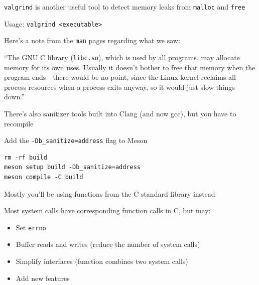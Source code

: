 \begin{slide}
  

  \texttt{valgrind} is another useful tool to detect memory leaks from
  \texttt{malloc} and \texttt{free}

  \leftspace{}Usage: \texttt{valgrind <executable>}
  \bigskip


  Here's a note from the \texttt{man} pages regarding what we saw:
  \medskip

  ``The GNU C library (\texttt{libc.so}), which is used by all programs,
    may allocate memory for its own uses. Usually it doesn't bother to free
    that memory when the program ends—there would be no point, since the Linux
    kernel reclaims all process resources when a process exits anyway, so it
    would just slow things down.''
  \bigskip

\end{slide}

\begin{slide}
  

  There's also sanitizer tools built into Clang (and now gcc), but you have to
  recompile

  \leftspace{}Add the \texttt{-Db_sanitize=address} flag to Meson
  \bigskip

  \begin{verbatim}
rm -rf build
meson setup build -Db_sanitize=address
meson compile -C build
  \end{verbatim}
\end{slide}

\begin{slide}
  

  Mostly you'll be using functions from the C standard library instead
  \bigskip

  Most system calls have corresponding function calls in C, but may:
  \begin{itemize}
    \item Set \texttt{errno}
    \item Buffer reads and writes (reduce the number of system calls)
    \item Simplify interfaces (function combines two system calls)
    \item Add new features
  \end{itemize}
\end{slide}

